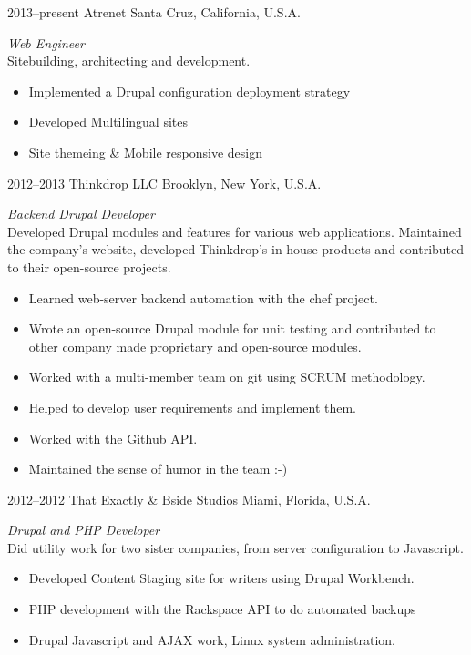 \documentclass[]{friggeri-cv} %
\begin{document}
\begin{entrylist}
\entry
{2013--present}
{Atrenet}
{Santa Cruz, California, U.S.A.}
{\emph{Web Engineer} \\
Sitebuilding, architecting and development.
\begin{itemize}
\item Implemented a Drupal configuration deployment strategy
\item Developed Multilingual sites
\item Site themeing \& Mobile responsive design
\end{itemize}}
\entry
{2012--2013}
{Thinkdrop LLC}
{Brooklyn, New York, U.S.A.}
{\emph{Backend Drupal Developer} \\
Developed Drupal modules and features for various web applications. Maintained the company's website, developed Thinkdrop's in-house products and contributed to their open-source projects.
\begin{itemize}
\item Learned web-server backend automation with the chef project.
\item Wrote an open-source Drupal module for unit testing and contributed to other company made proprietary and open-source modules.
\item Worked with a multi-member team on git using SCRUM methodology.
\item Helped to develop user requirements and implement them.
\item Worked with the Github API.
\item Maintained the sense of humor in the team :-)
\end{itemize}}
\entry
{2012--2012}
{That Exactly \& Bside Studios}
{Miami, Florida, U.S.A.}
{\emph{Drupal and PHP Developer} \\
Did utility work for two sister companies, from server configuration to Javascript.
\begin{itemize}
\item Developed Content Staging site for writers using Drupal Workbench.
\item PHP development with the Rackspace API to do automated backups
\item Drupal Javascript and AJAX work, Linux system administration.
\end{itemize}}

\end{entrylist}
\end{document}
